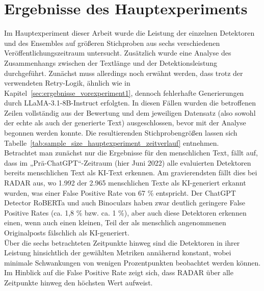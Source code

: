\section{Ergebnisse des Hauptexperiments}
Im Hauptexperiment dieser Arbeit wurde die Leistung der einzelnen Detektoren und des Ensembles auf größeren Stichproben aus sechs verschiedenen Veröffentlichungszeitraum untersucht. Zusätzlich wurde eine Analyse des Zusammenhangs zwischen der Textlänge und der Detektionsleistung durchgeführt.
Zunächst muss allerdings noch erwähnt werden, dass trotz der verwendeten Retry-Logik, ähnlich wie in Kapitel~\ref{sec:ergebnisse_vorexperiment1}, dennoch fehlerhafte Generierungen durch LLaMA-3.1-8B-Instruct erfolgten. In diesen Fällen wurden die betroffenen Zeilen vollständig aus der Bewertung und dem jeweiligen Datensatz (also sowohl der echte als auch der generierte Text) ausgeschlossen, bevor mit der Analyse begonnen werden konnte. Die resultierenden Stichprobengrößen lassen sich Tabelle~\ref{tab:sample_size_hauptexperiment_zeitverlauf} entnehmen.\\
Betrachtet man zunächst nur die Ergebnisse für den menschlichen Text, fällt auf, dass im „Prä-ChatGPT“-Zeitraum (hier Juni 2022) alle evaluierten Detektoren bereits menschlichen Text als KI-Text erkennen. Am gravierendsten fällt dies bei RADAR aus, wo 1.992 der 2.965 menschlichen Texte als KI-generiert erkannt wurden, was einer False Positive Rate von 67 \% entspricht. Der ChatGPT Detector RoBERTa und auch Binoculars haben zwar deutlich geringere False Positive Rates (ca. 1,8 \% bzw. ca. 1 \%), aber auch diese Detektoren erkennen einen, wenn auch einen kleinen, Teil der als menschlich angenommenen Originalposts fälschlich als KI-generiert. \\
Über die sechs betrachteten Zeitpunkte hinweg sind die Detektoren in ihrer Leistung hinsichtlich der gewählten Metriken annähernd konstant, wobei minimale Schwankungen von wenigen Prozentpunkten beobachtet werden können. Im Hinblick auf die False Positive Rate zeigt sich, dass RADAR über alle Zeitpunkte hinweg den höchsten Wert aufweist.
